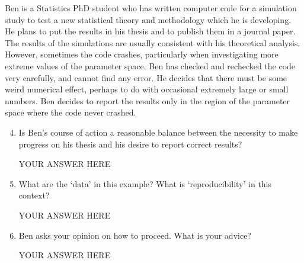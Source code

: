 \documentclass[12pt]{article}
\begin{document}
Ben is a Statistics PhD student who has written computer code for a simulation study to test a new statistical theory and methodology which he is developing.
He plans to put the results in his thesis and to publish them in a journal paper.
The results of the simulations are usually consistent with his theoretical analysis. 
However, sometimes the code crashes, particularly when investigating more extreme values of the parameter space.
Ben has checked and rechecked the code very carefully, and cannot find any error.
He decides that there must be some weird numerical effect, perhaps to do with occasional extremely large or small numbers.
Ben decides to report the results only in the region of the parameter space where the code never crashed. 
\begin{enumerate}\setcounter{enumi}{3}
\item Is Ben's course of action a reasonable balance between the necessity to make progress on his thesis and his desire to report correct results? 

YOUR ANSWER HERE

\item What are the `data' in this example? What is `reproducibility' in this context?

YOUR ANSWER HERE

\item Ben asks your opinion on how to proceed. What is your advice?

YOUR ANSWER HERE
\end{enumerate}
\end{document}
